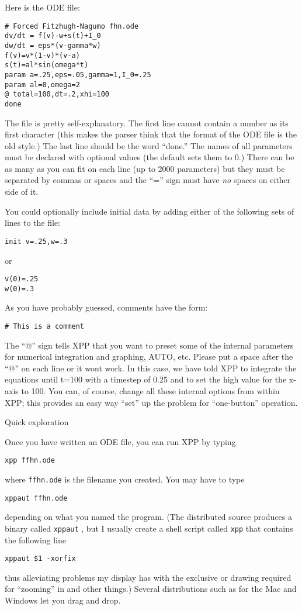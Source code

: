 \documentclass{article}
\newcommand{\tc}[1]{\addcontentsline{toc}{subsection}{#1}}
\begin{document}
Here is the ODE file:
\begin{verbatim}
# Forced Fitzhugh-Nagumo fhn.ode 
dv/dt = f(v)-w+s(t)+I_0
dw/dt = eps*(v-gamma*w)
f(v)=v*(1-v)*(v-a)
s(t)=al*sin(omega*t)
param a=.25,eps=.05,gamma=1,I_0=.25
param al=0,omega=2
@ total=100,dt=.2,xhi=100
done
\end{verbatim}

The file is pretty self-explanatory.  The first line cannot contain a
number as its first character (this makes the parser think that the
format of the ODE file is the old style.)  The last line should be the
word ``done.''  The names of all parameters must be declared with
optional values (the default sets them to 0.) There can be as many as
you can fit on each line (up to 2000 parameters) but they must be
separated by commas or spaces and the ``='' sign must have {\em no} spaces on
either side of it.  

You could optionally include initial data by adding either of the
following sets of lines to the file:
\begin{verbatim}
init v=.25,w=.3
\end{verbatim}
or
\begin{verbatim}
v(0)=.25
w(0)=.3
\end{verbatim}

As you have probably guessed, comments have the form:
\begin{verbatim}
# This is a comment
\end{verbatim}

The ``@'' sign tells XPP that you want to preset some of the internal
parameters for numerical integration and graphing, AUTO, etc. Please put a space after the ``@'' on each line or it wont work.
  In this case, we have told XPP
to integrate the equations until t=100 with a timestep of 0.25 and to
set the high value for the x-axis to 100.  You can, of course, change
all these internal options from within XPP; this provides an easy way
``set'' up the problem for ``one-button'' operation. 

\tc{Quick exploration.}
\begin{center} {\Large Quick exploration} \end{center}

Once you have written an ODE file, you can run XPP by typing
\begin{verbatim}
xpp ffhn.ode
\end{verbatim}
where {\tt ffhn.ode} is the filename you created.  You may have to
type
\begin{verbatim}
xppaut ffhn.ode
\end{verbatim}
depending on what you named the program. (The distributed source
produces a binary called {\tt xppaut} , but I usually create a shell
script called {\tt xpp} that contains the following line
\begin{verbatim}
xppaut $1 -xorfix
\end{verbatim}
thus alleviating problems my display has with the exclusive or drawing
required for ``zooming'' in and other things.)
Several distributions such as for the Mac and Windows let you drag and drop.
\end{document}
